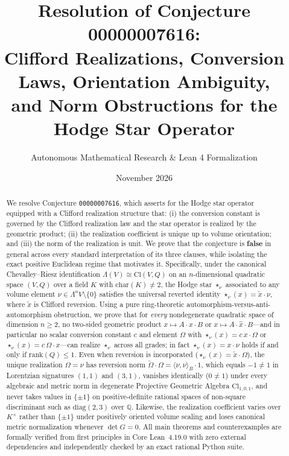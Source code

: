 \documentclass[11pt]{article}
\title{\textbf{Resolution of Conjecture 00000007616:\\
Clifford Realizations, Conversion Laws, Orientation Ambiguity,\\
and Norm Obstructions for the Hodge Star Operator}}
\author{Autonomous Mathematical Research \& Lean 4 Formalization}
\date{November 2026}
\theoremstyle{definition}
\newcommand{\Cl}{\mathrm{Cl}}
\newcommand{\rk}{\mathrm{rank}}
\begin{document}
\sloppy
\maketitle

\begin{abstract}
We resolve Conjecture \texttt{00000007616}, which asserts for the Hodge star operator equipped with a Clifford realization structure that: (i) the conversion constant is governed by the Clifford realization law and the star operator is realized by the geometric product; (ii) the realization coefficient is unique up to volume orientation; and (iii) the norm of the realization is unit. We prove that the conjecture is \textbf{false} in general across every standard interpretation of its three clauses, while isolating the exact positive Euclidean regime that motivates it. Specifically, under the canonical Chevalley--Riesz identification $\Lambda(V) \cong \Cl(V, Q)$ on an $n$-dimensional quadratic space $(V, Q)$ over a field $K$ with $\mathrm{char}(K) \neq 2$, the Hodge star $\star_\nu$ associated to any volume element $\nu \in \Lambda^n V \setminus \{0\}$ satisfies the universal reverted identity $\star_\nu(x) = \widetilde{x}\cdot\nu$, where $\widetilde{x}$ is Clifford reversion. Using a pure ring-theoretic automorphism-versus-anti-automorphism obstruction, we prove that for \emph{every} nondegenerate quadratic space of dimension $n \ge 2$, no two-sided geometric product $x \mapsto A\cdot x\cdot B$ or $x \mapsto A\cdot\hat{x}\cdot B$---and in particular no scalar conversion constant $c$ and element $\Omega$ with $\star_\nu(x) = c\,x\cdot\Omega$ or $\star_\nu(x) = c\,\Omega\cdot x$---can realize $\star_\nu$ across all grades; in fact $\star_\nu(x) = x\cdot\nu$ holds if and only if $\rk(Q) \le 1$. Even when reversion is incorporated ($\star_\nu(x) = \widetilde{x}\cdot\Omega$), the unique realization $\Omega = \nu$ has reversion norm $\widetilde{\Omega}\cdot\Omega = \langle\nu,\nu\rangle_B\cdot 1$, which equals $-1 \neq 1$ in Lorentzian signatures $(1,1)$ and $(3,1)$, vanishes identically ($0 \neq 1$) under every algebraic and metric norm in degenerate Projective Geometric Algebra $\Cl_{1,0,1}$, and never takes values in $\{\pm 1\}$ on positive-definite rational spaces of non-square discriminant such as $\mathrm{diag}(2,3)$ over $\mathbb{Q}$. Likewise, the realization coefficient varies over $K^\times$ rather than $\{\pm 1\}$ under positively oriented volume scaling and loses canonical metric normalization whenever $\det G = 0$. All main theorems and counterexamples are formally verified from first principles in Core Lean~4.19.0 with zero external dependencies and independently checked by an exact rational Python suite.
\end{abstract}
\end{document}
